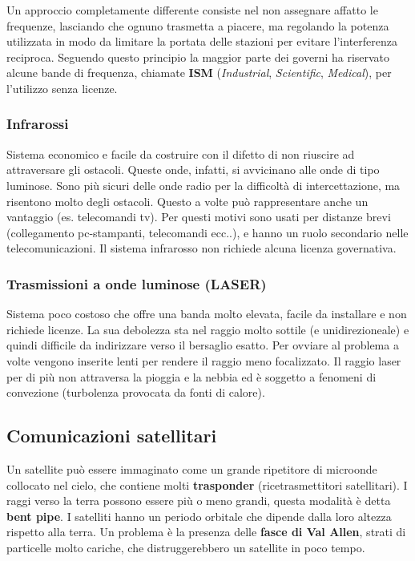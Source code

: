 Un approccio completamente differente consiste nel non assegnare affatto le frequenze, lasciando che ognuno trasmetta a piacere, ma regolando la potenza utilizzata in modo da limitare la portata delle stazioni per evitare l'interferenza reciproca. Seguendo questo principio la maggior parte dei governi ha riservato alcune bande di frequenza, chiamate \textbf{ISM} (\textit{Industrial}, \textit{Scientific}, \textit{Medical}), per l'utilizzo senza licenze.

\subsubsection{Infrarossi}

Sistema economico e facile da costruire con il difetto di non riuscire ad attraversare gli ostacoli. Queste onde, infatti, si avvicinano alle onde di tipo luminose. Sono più sicuri delle onde radio per la difficoltà di intercettazione, ma risentono molto degli ostacoli. Questo a volte può rappresentare anche un vantaggio (es. telecomandi tv). Per questi motivi sono usati per distanze brevi (collegamento pc-stampanti, telecomandi ecc..), e hanno un ruolo secondario nelle telecomunicazioni. Il sistema infrarosso non richiede alcuna licenza governativa.

\subsubsection{Trasmissioni a onde luminose (LASER)}

Sistema poco costoso che offre una banda molto elevata, facile da installare e non richiede licenze. La sua debolezza sta nel raggio molto sottile (e unidirezioneale) e quindi difficile da indirizzare verso il bersaglio esatto. Per ovviare al problema a volte vengono inserite lenti per rendere il raggio meno focalizzato. Il raggio laser per di più non attraversa la pioggia e la nebbia ed è soggetto a fenomeni di convezione (turbolenza provocata da fonti di calore).

\subsection{Comunicazioni satellitari}

Un satellite può essere immaginato come un grande ripetitore di microonde collocato nel cielo, che contiene molti \textbf{trasponder} (ricetrasmettitori satellitari). I raggi verso la terra possono essere più o meno grandi, questa modalità è detta \textbf{bent pipe}. I satelliti hanno un periodo orbitale che dipende dalla loro altezza rispetto alla terra. Un problema è la presenza delle \textbf{fasce di Val Allen}, strati di particelle molto cariche, che distruggerebbero un satellite in poco tempo.

